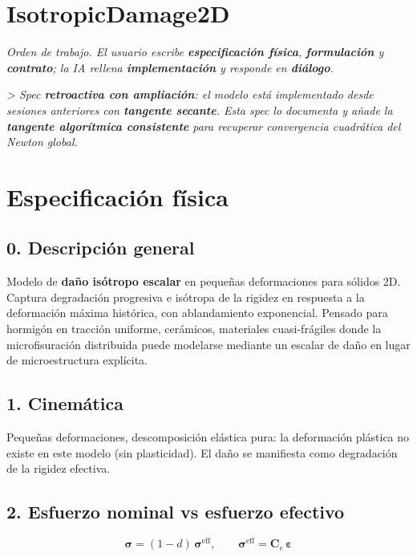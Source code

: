 \documentclass[11pt,letterpaper,oneside]{report}
\begin{document}
\section{IsotropicDamage2D}



\textit{Orden de trabajo. El usuario escribe \textbf{especificación física}, \textbf{formulación} y \textbf{contrato}; la IA rellena \textbf{implementación} y responde en \textbf{diálogo}.}

\textit{> Spec \textbf{retroactiva con ampliación}: el modelo está implementado desde sesiones anteriores con \textbf{tangente secante}. Esta spec lo documenta y añade la \textbf{tangente algorítmica consistente} para recuperar convergencia cuadrática del Newton global.}



\section{Especificación física}

\subsection{0. Descripción general}

Modelo de \textbf{daño isótropo escalar} en pequeñas deformaciones para sólidos 2D. Captura degradación progresiva e isótropa de la rigidez en respuesta a la deformación máxima histórica, con ablandamiento exponencial. Pensado para hormigón en tracción uniforme, cerámicos, materiales cuasi-frágiles donde la microfisuración distribuida puede modelarse mediante un escalar de daño en lugar de microestructura explícita.

\subsection{1. Cinemática}

Pequeñas deformaciones, descomposición elástica pura: la deformación plástica no existe en este modelo (sin plasticidad). El daño se manifiesta como degradación de la rigidez efectiva.

\subsection{2. Esfuerzo nominal vs esfuerzo efectivo}

\[
\boldsymbol\sigma = (1 - d)\,\boldsymbol\sigma^\text{eff}, \qquad \boldsymbol\sigma^\text{eff} = \mathbf C_e\,\boldsymbol\varepsilon
\]
\end{document}
